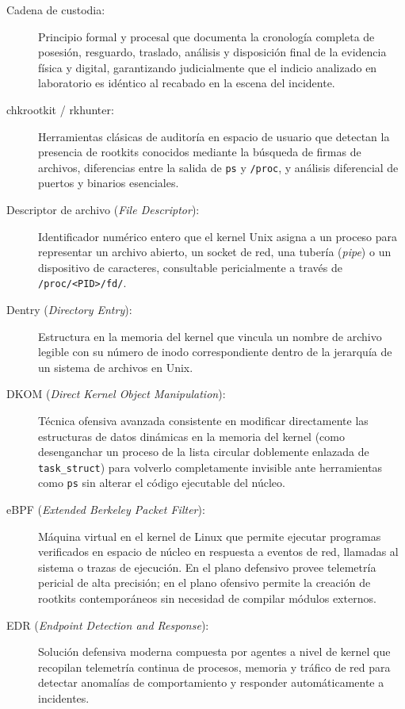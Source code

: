 \begin{description}
    \item[Cadena de custodia:] Principio formal y procesal que documenta la cronología completa de posesión, resguardo, traslado, análisis y disposición final de la evidencia física y digital, garantizando judicialmente que el indicio analizado en laboratorio es idéntico al recabado en la escena del incidente.

    \item[chkrootkit / rkhunter:] Herramientas clásicas de auditoría en espacio de usuario que detectan la presencia de rootkits conocidos mediante la búsqueda de firmas de archivos, diferencias entre la salida de \texttt{ps} y \texttt{/proc}, y análisis diferencial de puertos y binarios esenciales.

    \item[Descriptor de archivo (\textit{File Descriptor}):] Identificador numérico entero que el kernel Unix asigna a un proceso para representar un archivo abierto, un socket de red, una tubería (\textit{pipe}) o un dispositivo de caracteres, consultable pericialmente a través de \texttt{/proc/<PID>/fd/}.

    \item[Dentry (\textit{Directory Entry}):] Estructura en la memoria del kernel que vincula un nombre de archivo legible con su número de inodo correspondiente dentro de la jerarquía de un sistema de archivos en Unix.

    \item[DKOM (\textit{Direct Kernel Object Manipulation}):] Técnica ofensiva avanzada consistente en modificar directamente las estructuras de datos dinámicas en la memoria del kernel (como desenganchar un proceso de la lista circular doblemente enlazada de \texttt{task\_struct}) para volverlo completamente invisible ante herramientas como \texttt{ps} sin alterar el código ejecutable del núcleo.

    \item[eBPF (\textit{Extended Berkeley Packet Filter}):] Máquina virtual en el kernel de Linux que permite ejecutar programas verificados en espacio de núcleo en respuesta a eventos de red, llamadas al sistema o trazas de ejecución. En el plano defensivo provee telemetría pericial de alta precisión; en el plano ofensivo permite la creación de rootkits contemporáneos sin necesidad de compilar módulos externos.

    \item[EDR (\textit{Endpoint Detection and Response}):] Solución defensiva moderna compuesta por agentes a nivel de kernel que recopilan telemetría continua de procesos, memoria y tráfico de red para detectar anomalías de comportamiento y responder automáticamente a incidentes.


\end{description}
